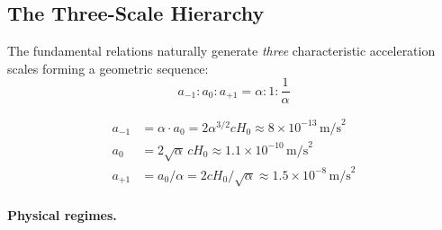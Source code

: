 \subsection{The Three-Scale Hierarchy}\label{sec:alpha-three-scale}

The fundamental relations naturally generate \textit{three} characteristic acceleration scales forming a geometric sequence:
\begin{equation}\label{eq:three-scale-hierarchy}
\boxed{a_{-1} : a_0 : a_{+1} = \alpha : 1 : \frac{1}{\alpha}}
\end{equation}

\begin{tcolorbox}[colback=green!5!white, colframe=green!50!black, title=Three-Scale Hierarchy]
\begin{align}
a_{-1} &= \alpha \cdot a_0 = 2\alpha^{3/2} cH_0 \approx 8 \times 10^{-13}\,\text{m/s}^2 \label{eq:a-minus1} \\
a_0 &= 2\sqrt{\alpha}\,cH_0 \approx 1.1 \times 10^{-10}\,\text{m/s}^2 \label{eq:a-zero} \\
a_{+1} &= a_0/\alpha = 2cH_0/\sqrt{\alpha} \approx 1.5 \times 10^{-8}\,\text{m/s}^2 \label{eq:a-plus1}
\end{align}
\end{tcolorbox}

\paragraph{Physical regimes.}
\begin{table}[h]
\centering
\caption{Characteristic acceleration scales and associated physical systems.}\label{tab:acc-scales}
\end{table}

